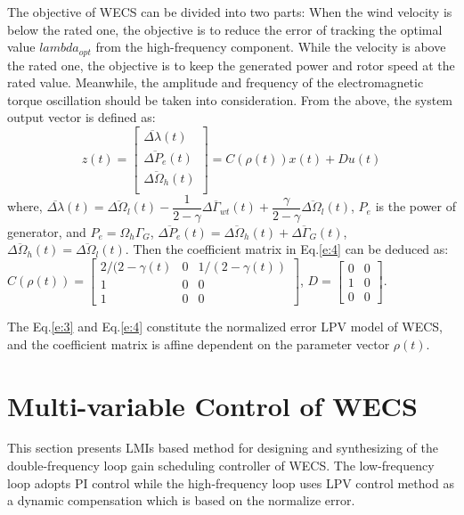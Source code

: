 \documentclass[english]{cccconf}
\begin{document}
The objective of WECS can be divided into two parts: When the wind velocity is below the
rated one, the objective is to reduce the error of  tracking the optimal value $lambda_{opt}$
from the high-frequency component. While the velocity is above the rated one, the
objective is to keep the generated power and rotor speed at the rated value. Meanwhile,
the amplitude and frequency of the electromagnetic torque oscillation should be taken
into consideration. From the above, the system output vector is defined as:
\begin{equation}\label{e:4}
z(t)=\begin{bmatrix}
\overline{\Delta\lambda}(t) \\
\overline{\Delta{}P_e}(t) \\
\overline{\Delta\Omega_h}(t) \\
\end{bmatrix}
=C(\rho(t))x(t) + Du(t)
\end{equation}
where, $\overline{\Delta\lambda}(t) = \overline{\Delta\Omega_l}(t) -
\dfrac{1}{2-\gamma}\overline{\Delta\Gamma_{wt}}(t) + \dfrac{\gamma}{2-\gamma}\overline{\Delta\Omega_l}(t)$,
$P_e$ is the power of generator,  and $P_e = \Omega_h\Gamma_G$,
$\overline{\Delta{}P_e}(t) = \overline{\Delta\Omega_h}(t) + \overline{\Delta\Gamma_G}(t)$,
$\overline{\Delta\Omega_h}(t) = \overline{\Delta\Omega_l}(t)$.
Then the coefficient matrix in Eq.\ref{e:4} can be deduced as:
$C(\rho(t)) = \begin{bmatrix}
2/(2-\gamma(t) & 0 & 1/(2-\gamma(t)) \\
1 & 0 & 0 \\
1 & 0 & 0
\end{bmatrix}$,
$D = \begin{bmatrix}
0 & 0 \\
1 & 0 \\
0 & 0
\end{bmatrix}$.

The Eq.\ref{e:3} and Eq.\ref{e:4} constitute the normalized error LPV model of WECS,
and the coefficient matrix is affine dependent on the parameter vector $\rho(t)$.

\section{Multi-variable Control of WECS}

This section presents LMIs based method for designing and synthesizing of the 
double-frequency loop gain scheduling controller of WECS. The  low-frequency 
loop adopts PI control while the high-frequency loop uses
LPV control method as a dynamic compensation which is based on the normalize error.
\end{document}
